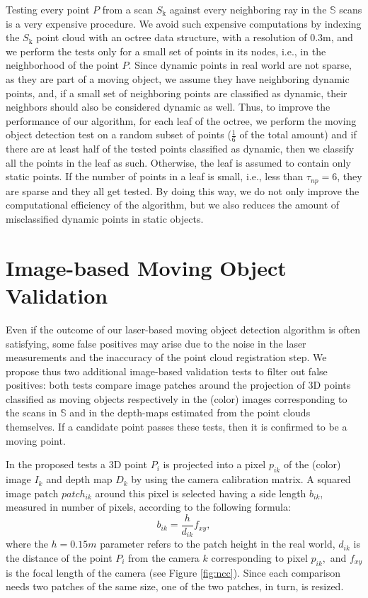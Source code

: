 Testing every point $P$ from a scan $S_{\text{k}}$ against every neighboring ray in the $\mathbb{S}$ scans is a very expensive procedure. 
We avoid such expensive computations by indexing the $S_{\text{k}}$ point cloud with an octree data structure, with a resolution of 0.3m, and we perform the tests only for a small set of points in its nodes, i.e., in the neighborhood of the point $P$.
Since dynamic points in real world are not sparse, as they are part of a moving object, we assume they have neighboring dynamic points, and, if a small set of neighboring points are classified as dynamic, their neighbors should also be considered dynamic as well. 
Thus, to improve the performance of our algorithm, for each leaf of the octree, we perform the moving object detection test on a random subset of points ($\frac{1}{6}$ of the total amount) and if there are at least half of the tested points classified as dynamic, then we classify all the points in the leaf as such. Otherwise, the leaf is assumed to contain only static points.
If the number of points in a leaf is small, i.e., less than $\tau_{np}=6$, they are sparse and they all get tested. By doing this way, we do not only improve the computational efficiency of the algorithm, but we also reduces the amount of misclassified dynamic points in static objects.


\section{Image-based Moving Object Validation}%
\label{sec:images}
Even if the outcome of our laser-based moving object detection algorithm is often satisfying, some false positives may arise due to the noise in the laser measurements and the inaccuracy of the point cloud registration step. 
We propose thus two additional image-based validation tests to filter out false positives: both tests compare image patches around the projection of 3D points classified as moving objects respectively in the (color) images corresponding to the scans in $\mathbb{S}$ and in the depth-maps estimated from the point clouds themselves. If a candidate point passes these tests, then it is confirmed to be a moving point.

In the proposed tests a 3D point $P_i$ is projected into a pixel $p_{ik}$ of the (color) image $I_k$ and depth map $D_k$ by using the camera calibration matrix. A squared image patch $patch_{ik}$ around this pixel is selected having a side length $b_{ik}$, measured in number of pixels, according to the following formula:
\begin{equation}
 b_{ik} = \frac{h}{d_{ik}}f_{xy},
\end{equation}
where the $h=0.15m$ parameter refers to the patch height in the real world, $d_{ik}$ is the distance of the point $P_i$ from the camera $k$ corresponding to pixel $p_{ik},$ and $f_{xy}$ is the focal length of the camera (see Figure \ref{fig:ncc}).
Since each comparison needs two patches of the same size, one of the two patches, in turn, is resized.

